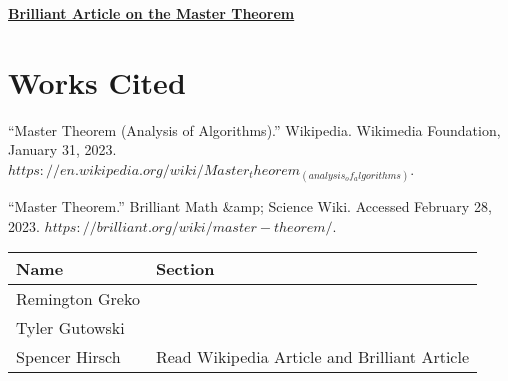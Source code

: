 \documentclass{article}
\begin{document}
\bigskip

\noindent \textbf{\href{https://brilliant.org/wiki/master-theorem/}{Brilliant Article on the Master Theorem}}





\pagebreak
\section{Works Cited}

``Master Theorem (Analysis of Algorithms).'' Wikipedia. Wikimedia Foundation, January 31, 2023. $https://en.wikipedia.org/wiki/Master_theorem_(analysis_of_algorithms)$.

``Master Theorem.'' Brilliant Math \&amp; Science Wiki. Accessed February 28, 2023. $https://brilliant.org/wiki/master-theorem/$. 

\pagebreak

\begin{center}
        \begin{tabular}{|p{3cm}|p{6cm}|}
            \hline
            \textbf{Name} & \textbf{Section} \\
            \hline
            Remington Greko & \\
            \hline
            Tyler Gutowski & \\
            \hline
            Spencer Hirsch & Read Wikipedia Article and Brilliant Article \\
            \hline
        \end{tabular}
    \end{center}
\end{document}
